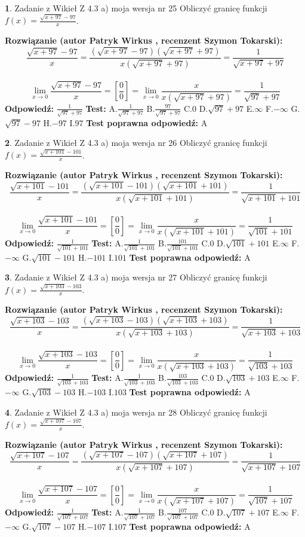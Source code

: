 \documentclass[12pt, a4paper]{article}
\theoremstyle{definition} %
\newtheorem{zad}{}
\newcommand{\zadStart}[1]{\begin{zad}#1\newline}
\newcommand{\zadStop}{\end{zad}}
\newcommand{\rozwStart}[2]{\noindent \textbf{Rozwiązanie (autor #1 , recenzent #2): }\newline}
\newcommand{\rozwStop}{\newline}
\newcommand{\odpStart}{\noindent \textbf{Odpowiedź:}\newline}
\newcommand{\odpStop}{\newline}
\newcommand{\testStart}{\noindent \textbf{Test:}\newline}
\newcommand{\testStop}{\newline}
\newcommand{\kluczStart}{\noindent \textbf{Test poprawna odpowiedź:}\newline}
\newcommand{\kluczStop}{\newline}
\begin{document}
\zadStart{Zadanie z Wikieł Z 4.3 a) moja wersja nr 25}
Obliczyć granicę funkcji $f(x)=\frac{\sqrt{x+97}-97}{x}$.
\zadStop
\rozwStart{Patryk Wirkus}{Szymon Tokarski}
$$\frac{\sqrt{x+97}-97}{x}=\frac{(\sqrt{x+97}-97)(\sqrt{x+97}+97)}{x(\sqrt{x+97}+97)}=\frac{1}{\sqrt{x+97}+97}$$
\\
$$\lim\limits_{x\to0}\frac{\sqrt{x+97}-97}{x}=[\frac{0}{0}]=
\lim\limits_{x\to0}\frac{x}{x(\sqrt{x+97}+97)} = \frac{1}{\sqrt{97}+97}$$
\rozwStop
\odpStart
$\frac{1}{\sqrt{97}+97}$
\odpStop
\testStart
A.$\frac{1}{\sqrt{97}+97}$
B.$\frac{97}{\sqrt{97}+97}$
C.$0$
D.$\sqrt{97}+97$
E.$\infty$
F.$-\infty$
G.$\sqrt{97}-97$
H.$-97$
I.$97$
\testStop
\kluczStart
A
\kluczStop



\zadStart{Zadanie z Wikieł Z 4.3 a) moja wersja nr 26}
Obliczyć granicę funkcji $f(x)=\frac{\sqrt{x+101}-101}{x}$.
\zadStop
\rozwStart{Patryk Wirkus}{Szymon Tokarski}
$$\frac{\sqrt{x+101}-101}{x}=\frac{(\sqrt{x+101}-101)(\sqrt{x+101}+101)}{x(\sqrt{x+101}+101)}=\frac{1}{\sqrt{x+101}+101}$$
\\
$$\lim\limits_{x\to0}\frac{\sqrt{x+101}-101}{x}=[\frac{0}{0}]=
\lim\limits_{x\to0}\frac{x}{x(\sqrt{x+101}+101)} = \frac{1}{\sqrt{101}+101}$$
\rozwStop
\odpStart
$\frac{1}{\sqrt{101}+101}$
\odpStop
\testStart
A.$\frac{1}{\sqrt{101}+101}$
B.$\frac{101}{\sqrt{101}+101}$
C.$0$
D.$\sqrt{101}+101$
E.$\infty$
F.$-\infty$
G.$\sqrt{101}-101$
H.$-101$
I.$101$
\testStop
\kluczStart
A
\kluczStop



\zadStart{Zadanie z Wikieł Z 4.3 a) moja wersja nr 27}
Obliczyć granicę funkcji $f(x)=\frac{\sqrt{x+103}-103}{x}$.
\zadStop
\rozwStart{Patryk Wirkus}{Szymon Tokarski}
$$\frac{\sqrt{x+103}-103}{x}=\frac{(\sqrt{x+103}-103)(\sqrt{x+103}+103)}{x(\sqrt{x+103}+103)}=\frac{1}{\sqrt{x+103}+103}$$
\\
$$\lim\limits_{x\to0}\frac{\sqrt{x+103}-103}{x}=[\frac{0}{0}]=
\lim\limits_{x\to0}\frac{x}{x(\sqrt{x+103}+103)} = \frac{1}{\sqrt{103}+103}$$
\rozwStop
\odpStart
$\frac{1}{\sqrt{103}+103}$
\odpStop
\testStart
A.$\frac{1}{\sqrt{103}+103}$
B.$\frac{103}{\sqrt{103}+103}$
C.$0$
D.$\sqrt{103}+103$
E.$\infty$
F.$-\infty$
G.$\sqrt{103}-103$
H.$-103$
I.$103$
\testStop
\kluczStart
A
\kluczStop



\zadStart{Zadanie z Wikieł Z 4.3 a) moja wersja nr 28}
Obliczyć granicę funkcji $f(x)=\frac{\sqrt{x+107}-107}{x}$.
\zadStop
\rozwStart{Patryk Wirkus}{Szymon Tokarski}
$$\frac{\sqrt{x+107}-107}{x}=\frac{(\sqrt{x+107}-107)(\sqrt{x+107}+107)}{x(\sqrt{x+107}+107)}=\frac{1}{\sqrt{x+107}+107}$$
\\
$$\lim\limits_{x\to0}\frac{\sqrt{x+107}-107}{x}=[\frac{0}{0}]=
\lim\limits_{x\to0}\frac{x}{x(\sqrt{x+107}+107)} = \frac{1}{\sqrt{107}+107}$$
\rozwStop
\odpStart
$\frac{1}{\sqrt{107}+107}$
\odpStop
\testStart
A.$\frac{1}{\sqrt{107}+107}$
B.$\frac{107}{\sqrt{107}+107}$
C.$0$
D.$\sqrt{107}+107$
E.$\infty$
F.$-\infty$
G.$\sqrt{107}-107$
H.$-107$
I.$107$
\testStop
\kluczStart
A
\kluczStop
\end{document}
